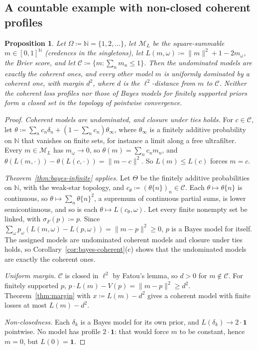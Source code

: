 \documentclass[11pt]{article}
\newtheorem{proposition}[theorem]{Proposition}
\theoremstyle{definition}
\theoremstyle{remark}
\newcommand{\N}{\mathbb N}
\newcommand{\M}{\mathcal M}
\newcommand{\C}{\mathcal C}
\newcommand{\one}{\mathbf 1}
\begin{document}
\subsection{A countable example with non-closed coherent profiles}
\begin{proposition}\label{prop:countable}
Let $\Omega\coloneqq\N=\{1,2,\dots\}$, let $\M_L$ be the square-summable $m\in[0,1]^\N$ (credences in the singletons), let $L(m,\omega)\coloneqq\lVert m\rVert^2+1-2m_\omega$, the Brier score, and let $\C\coloneqq\{m:\sum_nm_n\le1\}$. Then the undominated models are exactly the coherent ones, and every other model $m$ is uniformly dominated by a coherent one, with margin $d^2$, where $d$ is the $\ell^2$-distance from $m$ to $\C$. Neither the coherent loss profiles nor those of Bayes models for finitely supported priors form a closed set in the topology of pointwise convergence.
\end{proposition}
\begin{proof}
\emph{Coherent models are undominated, and closure under ties holds.} For $c\in\C$, let $\theta\coloneqq\sum_nc_n\delta_n+(1-\sum_nc_n)\theta_\infty$, where $\theta_\infty$ is a finitely additive probability on $\N$ that vanishes on finite sets, for instance a limit along a free ultrafilter. Every $m\in\M_L$ has $m_\omega\to0$, so $\theta(m)=\sum_nc_nm_n$, and $\theta(L(m,\cdot))-\theta(L(c,\cdot))=\lVert m-c\rVert^2$. So $L(m)\le L(c)$ forces $m=c$.

\emph{Theorem~\ref{thm:bayes-infinite} applies.} Let $\Theta$ be the finitely additive probabilities on $\N$, with the weak-star topology, and $c_\theta\coloneqq(\theta\{n\})_n\in\C$. Each $\theta\mapsto\theta\{n\}$ is continuous, so $\theta\mapsto\sum_n\theta\{n\}^2$, a supremum of continuous partial sums, is lower semicontinuous, and so is each $\theta\mapsto L(c_\theta,\omega)$. Let every finite nonempty set be linked, with $\sigma_F(p)\coloneqq p$. Since $\sum_\omega p_\omega(L(m,\omega)-L(p,\omega))=\lVert m-p\rVert^2\ge0$, $p$ is a Bayes model for itself. The assigned models are undominated coherent models and closure under ties holds, so Corollary~\ref{cor:bayes-coherent}(c) shows that the undominated models are exactly the coherent ones.

\emph{Uniform margin.} $\C$ is closed in $\ell^2$ by Fatou's lemma, so $d>0$ for $m\notin\C$. For finitely supported $p$, $p\cdot L(m)-V(p)=\lVert m-p\rVert^2\ge d^2$. Theorem~\ref{thm:margin} with $x\coloneqq L(m)-d^2$ gives a coherent model with finite losses at most $L(m)-d^2$.

\emph{Non-closedness.} Each $\delta_k$ is a Bayes model for its own prior, and $L(\delta_k)\to2\cdot\one$ pointwise. No model has profile $2\cdot\one$: that would force $m$ to be constant, hence $m=0$, but $L(0)=\one$.
\end{proof}
\end{document}
